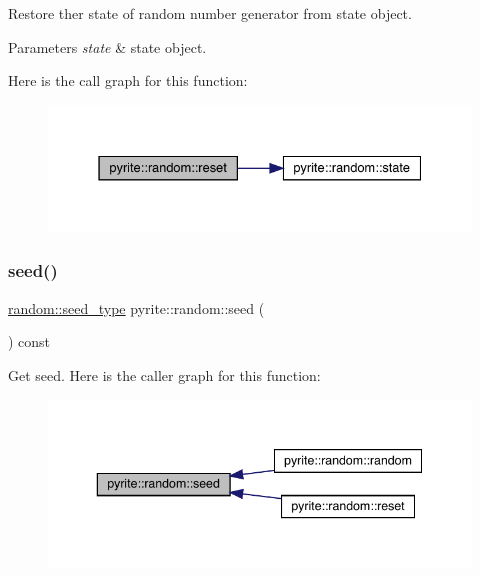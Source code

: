 Restore ther state of random number generator from state object.


\begin{DoxyParams}{Parameters}
{\em state} & state object. \\
\hline
\end{DoxyParams}
Here is the call graph for this function\+:
\nopagebreak
\begin{figure}[H]
\begin{center}
\leavevmode
\includegraphics[width=331pt]{d2/df9/classpyrite_1_1random_a5abed1bb1fbd44ea3e62197a9b11dcd0_cgraph}
\end{center}
\end{figure}
\mbox{\label{classpyrite_1_1random_ae3a15129c724af7168f55135226c0dfc}} 
\subsubsection{\texorpdfstring{seed()}{seed()}}
{\footnotesize\ttfamily \mbox{\hyperlink{classpyrite_1_1random_a936dc9fd106c9b125ccbf3aa6d525e4b}{random\+::seed\+\_\+type}} pyrite\+::random\+::seed (\begin{DoxyParamCaption}{ }\end{DoxyParamCaption}) const\hspace{0.3cm}{\ttfamily [noexcept]}}

Get seed. Here is the caller graph for this function\+:
\nopagebreak
\begin{figure}[H]
\begin{center}
\leavevmode
\includegraphics[width=343pt]{d2/df9/classpyrite_1_1random_ae3a15129c724af7168f55135226c0dfc_icgraph}
\end{center}
\end{figure}
\mbox{\label{classpyrite_1_1random_a25c469022ddee73c6a4ecce2814d22d4}} 
